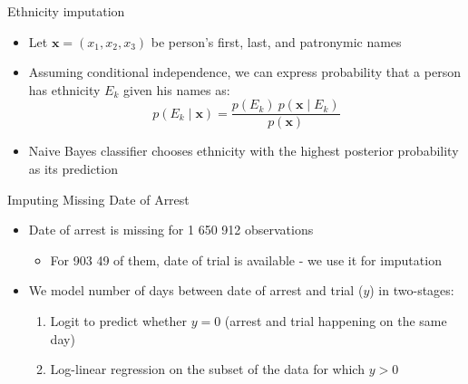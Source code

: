 \documentclass[11pt]{beamer}
\begin{document}
\begin{frame}[label=ethnicity_imputation]{Ethnicity imputation}
\begin{itemize}
    \item Let  $\boldsymbol{x} = \left(x_1, x_2, x_3\right)$ be person's first, last, and patronymic names
    \item Assuming conditional independence, we can express probability that a person has ethnicity $E_k$ given his names as:
    \begin{equation*}
p(E_k \mid \mathbf{x}) = \frac{p(E_k) \ p(\mathbf{x} \mid E_k)}{p(\mathbf{x})}
\end{equation*}
    \item Naive Bayes classifier chooses ethnicity with the highest posterior probability as its prediction

\end{itemize}
\hyperlink{data}{}
\end{frame}

\begin{frame}[label=arrest_date_imputation]{Imputing Missing Date of Arrest}
\begin{itemize}
    \item Date of arrest is missing for 1 650 912 observations 
    \begin{itemize}
        \item For 903 49 of them, date of trial is available - we use it for imputation
    \end{itemize}
    \item We model number of days between date of arrest and trial ($y$) in two-stages:
    \begin{enumerate}
        \item Logit to predict whether $y = 0$ (arrest and trial happening on the same day)
        \item  Log-linear regression on the subset of the data for which $y > 0$ 
    \end{enumerate}
\end{itemize}
\hyperlink{data}{}
\end{frame}
\end{document}
